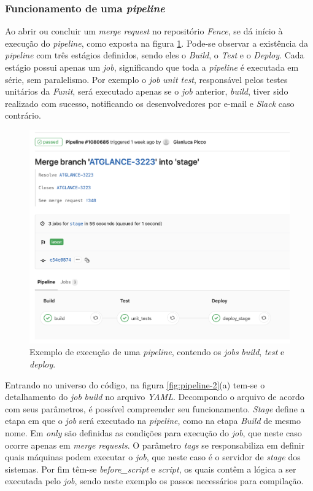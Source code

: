 \hypertarget{funcionamento-de-uma-pipeline}{%
\subsubsection{\texorpdfstring{Funcionamento de uma \emph{pipeline}}{Funcionamento de uma pipeline}}\label{funcionamento-de-uma-pipeline}}

Ao abrir ou concluir um \emph{merge request} no repositório \emph{Fence}, se dá início à execução do \emph{pipeline}, como exposta na figura \ref{fig:pipeline}. Pode-se observar a existência da \emph{pipeline} com três estágios definidos, sendo eles o \emph{Build}, o \emph{Test} e o \emph{Deploy}. Cada estágio possui apenas um \emph{job}, significando que toda a \emph{pipeline} é executada em série, sem paralelismo. Por exemplo o \emph{job} \emph{unit test}, responsável pelos testes unitários da \emph{Funit}, será executado apenas se o \emph{job} anterior, \emph{build}, tiver sido realizado com sucesso, notificando os desenvolvedores por e-mail e \emph{Slack} caso contrário.

\begin{figure}[H]
    \centering
    \includegraphics[width=13cm]{source/4-solucao/images/pipeline.png}
    \caption{Exemplo de execução de uma \emph{pipeline}, contendo os \emph{jobs} \emph{build}, \emph{test} e \emph{deploy}.}
    \label{fig:pipeline}
\end{figure}

Entrando no universo do código, na figura \ref{fig:pipeline-2}(a) tem-se o detalhamento do \emph{job} \emph{build} no arquivo \emph{YAML}. Decompondo o arquivo de acordo com seus parâmetros, é possível compreender seu funcionamento. \emph{Stage} define a etapa em que o \emph{job} será executado na \emph{pipeline}, como na etapa \emph{Build} de mesmo nome. Em \emph{only} são definidas as condições para execução do \emph{job}, que neste caso ocorre apenas em \emph{merge requests}. O parâmetro \emph{tags} se responsabiliza em definir quais máquinas podem executar o \emph{job}, que neste caso é o servidor de \emph{stage} dos sistemas. Por fim têm-se \emph{before\_script} e \emph{script}, os quais contêm a lógica a ser executada pelo \emph{job}, sendo neste exemplo os passos necessários para compilação.

